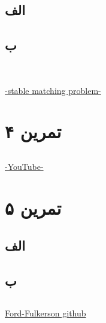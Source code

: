 \documentclass[]{article}
\begin{document}
\subsection*{\color{blue}{جواب}}
\subsection*{الف}

\subsection*{ب}

\\
\begin{latin}
\href{https://www.cs.csustan.edu/~john/Classes/CS4440/Notes/01A_StableMatch/01A_StableMatch.html}{-stable matching problem-}
\end{latin}


\pagebreak
\section*{تمرین ۴}

\subsection*{\color{blue}{جواب}}

\begin{latin}
    \href{https://www.youtube.com/watch?v=0tjpC0MCwY8l}{-YouTube-}
\end{latin}

\pagebreak
\section*{تمرین ۵}

\subsection*{\color{blue}{جواب}}
\subsection*{الف}

\subsection*{ب}

\subsection*{\color{red}{مراجع}}
\begin{latin}
    \href{https://github.com/anxiaonong/Maxflow-Algorithms/blob/master/Ford-Fulkerson%20Algorithm.py}{Ford-Fulkerson github}
\end{latin}
\end{document}
